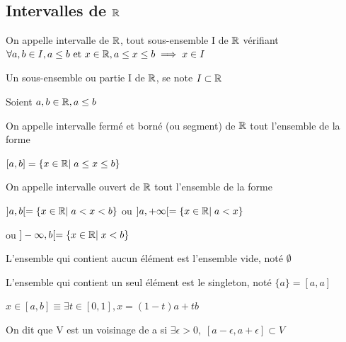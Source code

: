 \documentclass[a4paper, 12pt]{article}
\begin{document}
\subsection{Intervalles de $\mathbb{R}$}

\begin{definition}
    On appelle intervalle de $\mathbb{R}$, tout sous-ensemble I de $\mathbb{R}$ vérifiant
    $\forall a, b \in I, a \leq b \text{ et } x \in \mathbb{R}, a \leq x \leq b \implies x \in I$
\end{definition}

\begin{remarque}
    Un sous-ensemble ou partie I de $\mathbb{R}$, se note $I \subset \mathbb{R}$
\end{remarque}

\begin{definition}
    Soient $a, b \in \mathbb{R}, a \leq b$

    On appelle intervalle fermé et borné (ou segment) de $\mathbb{R}$ tout l'ensemble de la forme

    $[a, b] = \{x \in \mathbb{R} | \; a \leq x \leq b\}$
    
    \vspace{0.5em}

    On appelle intervalle ouvert de $\mathbb{R}$ tout l'ensemble de la forme

    $]a, b[ = \{x \in \mathbb{R} | \; a < x < b\}$
    \quad ou \quad
    $]a, +\infty[ = \{x \in \mathbb{R} | \; a < x\}$
    \par ou \quad
    $]-\infty, b[ = \{x \in \mathbb{R} | \; x < b\}$
\end{definition}

\begin{remarque}
    L'ensemble qui contient aucun élément est l'ensemble vide, noté $\emptyset$
\end{remarque}

\begin{remarque}
    L'ensemble qui contient un seul élément est le singleton, noté $\{a\} = [a, a]$
\end{remarque}

\begin{remarque}
    $x \in [a, b] \equiv \exists t \in [0, 1], x = (1-t)a + tb$
\end{remarque}

\begin{definition}
    On dit que V est un voisinage de a si $\exists \epsilon \gt 0, \; [a - \epsilon, a + \epsilon] \subset V$
\end{definition}
\end{document}

